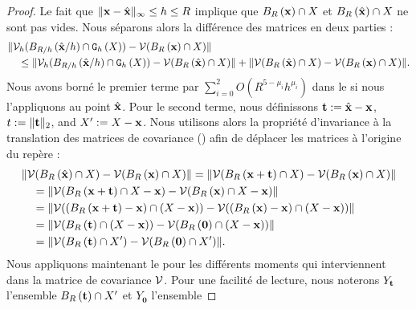 \begin{proof}
  Le fait que $\| \mathbf{x} - \hat{\mathbf{x}} \|_\infty \le h \le R$ implique que
  $B_{R}\left(\mathbf{x}\right) \cap X$ et $B_{R}\left(\hat{\mathbf{x}}\right) \cap X$ ne sont pas
  vides. Nous séparons alors la différence des matrices en deux parties :
  \begin{align}
  &\| \mathcal{V}_{h}( B_{R/h}\left(\hat{\mathbf{x}}/h\right) \cap  \mathtt{G}_{h}\left(X\right) ) - \mathcal{V}( B_{R}\left(\mathbf{x}\right) \cap X ) \| \\ \nonumber
  & \quad \le  \| \mathcal{V}_{h}( B_{R/h}\left(\hat{\mathbf{x}}/h\right) \cap  \mathtt{G}_{h}\left(X\right) ) - \mathcal{V}( B_{R}\left(\hat{\mathbf{x}}\right) \cap X ) \|
  + \| \mathcal{V}( B_{R}\left(\hat{\mathbf{x}}\right) \cap X ) - \mathcal{V}( B_{R}\left(\mathbf{x}\right) \cap X ) \|.
 \end{align}
  Nous avons borné le premier terme par $\sum_{i=0}^2 O(R^{5-\mu_i}h^{\mu_i})$
  dans le  si nous l'appliquons au point
  $\hat{\mathbf{x}}$. Pour le second terme, nous définissons $\mathbf{t} := \hat{\mathbf{x}} -
  \mathbf{x}$, $t := \| \mathbf{t} \|_2$, and $X' := X - \mathbf{x}$. Nous
  utilisons alors la propriété d'invariance à la translation des matrices de
  covariance () afin de déplacer
  les matrices à l'origine du repère :
  \begin{align}
    &\| \mathcal{V}( B_{R}\left(\hat{\mathbf{x}}\right) \cap X ) - \mathcal{V}( B_{R}\left(\mathbf{x}\right) \cap X )\|
    = \| \mathcal{V}( B_{R}\left(\mathbf{x} + \mathbf{t}\right) \cap X ) - \mathcal{V}( B_{R}\left(\mathbf{x}\right) \cap X )\| \\
    & \quad = \| \mathcal{V}( B_{R}\left(\mathbf{x} + \mathbf{t}\right) \cap X - \mathbf{x} ) - \mathcal{V}( B_{R}\left(\mathbf{x}\right) \cap X - \mathbf{x} )\| \\
    & \quad = \| \mathcal{V}( (B_{R}\left(\mathbf{x} + \mathbf{t}\right) - \mathbf{x}) \cap (X - \mathbf{x}) ) - \mathcal{V}( (B_{R}\left(\mathbf{x}\right) - \mathbf{x}) \cap (X - \mathbf{x}) )\| \\
    & \quad = \| \mathcal{V}( B_{R}\left(\mathbf{t}\right) \cap (X - \mathbf{x}) ) - \mathcal{V}( B_{R}\left(\mathbf{0}\right) \cap (X - \mathbf{x}) )\| \\
    & \quad = \| \mathcal{V}( B_{R}\left(\mathbf{t}\right) \cap X' ) - \mathcal{V}( B_{R}\left(\mathbf{0}\right) \cap X' )\|.
  \end{align}
  Nous appliquons maintenant le  pour
  les différents moments qui interviennent dans la matrice de covariance $\mathcal{V}$.
  Pour une facilité de lecture, nous noterons $Y_{\mathbf{t}}$ l'ensemble
  $B_{R}\left(\mathbf{t}\right) \cap X'$ et $Y_{\mathbf{0}}$ l'ensemble

\end{proof}
